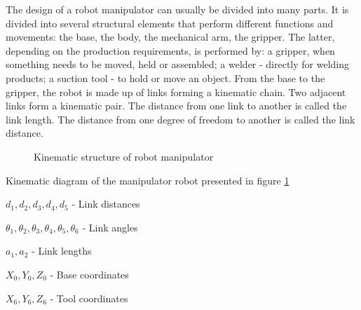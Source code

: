 The design of a robot manipulator can usually be divided into many parts.
It is divided into several structural elements that perform different functions and movements: the base, the body, the mechanical arm, the gripper. The latter, depending on the production requirements, is performed by: a gripper, when something needs to be moved, held or assembled; a welder - directly for welding products; a suction tool - to hold or move an object. From the base to the gripper, the robot is made up of links forming a kinematic chain. Two adjacent links form a kinematic pair. The distance from one link to another is called the link length. The distance from one degree of freedom to another is called the link distance. 



\begin{figure}[H]
	\centering


\caption{Kinematic structure of robot manipulator} \label{fig:kinematic1}
\end{figure}

Kinematic diagram of the manipulator robot presented in figure \ref{fig:kinematic1} 


\begin{math}d_1 , d_2, d_3,d_4,d_5 \end{math} - Link distances

\begin{math}\theta_1 , \theta_2, \theta_3,\theta_4,\theta_5,\theta_6\end{math} - Link angles

\begin{math}a_1 , a_2\end{math} - Link lengths


\begin{math} X_0, Y_0, Z_0 \end{math} - Base coordinates

\begin{math} X_6, Y_6, Z_6 \end{math} - Tool coordinates

